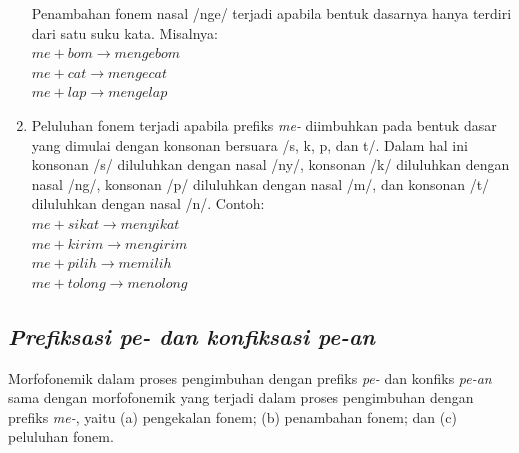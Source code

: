 \begin{enumerate}
	Penambahan fonem nasal /nge/ terjadi apabila bentuk dasarnya hanya terdiri dari satu suku kata. Misalnya:\\
	$me + bom \rightarrow mengebom$\\
	$me + cat \rightarrow mengecat$\\
	$me + lap \rightarrow mengelap$
	
	\item Peluluhan fonem terjadi apabila prefiks \textit{me-} diimbuhkan pada bentuk dasar yang dimulai dengan konsonan bersuara /s, k, p, dan t/. Dalam hal ini konsonan /s/ diluluhkan dengan nasal /ny/, konsonan /k/ diluluhkan dengan nasal /ng/, konsonan /p/ diluluhkan dengan nasal /m/, dan konsonan /t/ diluluhkan dengan nasal /n/. Contoh:\\
	$me + sikat \rightarrow menyikat$\\
	$me + kirim \rightarrow mengirim$\\
	$me + pilih \rightarrow memilih$\\
	$me + tolong \rightarrow menolong$
	
\end{enumerate}


\subsection{\textit{Prefiksasi pe- dan konfiksasi pe-an}}
\label{sec:prefiksasiPe-}

Morfofonemik dalam proses pengimbuhan dengan prefiks \textit{pe-} dan konfiks \textit{pe-an} sama dengan morfofonemik yang terjadi dalam proses pengimbuhan dengan prefiks \textit{me-}, yaitu (a) pengekalan fonem; (b) penambahan fonem; dan (c) peluluhan fonem.

